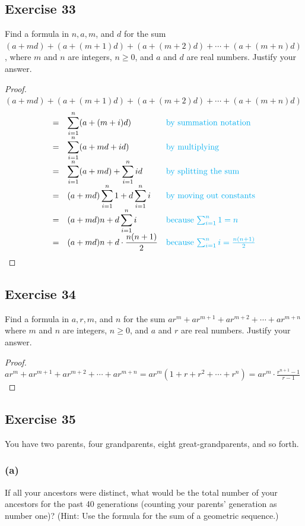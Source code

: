 \documentclass[14pt]{extarticle}
\newcommand{\dps}{\displaystyle}
\newcommand{\cy}{\color{cyan}}
\begin{document}
\subsection{Exercise 33}
Find a formula in $n, a, m$, and $d$ for the sum $(a + md) + (a + (m + 1)d) + (a + (m + 2)d) + \cdots + (a + (m + n)d)$, where $m$ and $n$ are integers, $n \geq 0$, and $a$ and $d$ are real numbers. Justify your answer.

\begin{proof}
$(a + md) + (a + (m + 1)d) + (a + (m + 2)d) + \cdots + (a + (m + n)d)$
\[
\begin{array}{lll}
= & \dps \sum_{i = 1}^{n} (a+(m+i)d) & \text{\cy by summation notation} \\
= & \dps \sum_{i = 1}^{n} (a+md+id) & \text{\cy by multiplying} \\
= & \dps \sum_{i = 1}^{n} (a+md) + \sum_{i = 1}^{n} id & \text{\cy by splitting the sum} \\
= & \dps (a+md)\sum_{i = 1}^{n} 1 + d\sum_{i = 1}^{n} i & \text{\cy by moving out constants} \\
= & \dps (a+md)n + d \sum_{i = 1}^{n} i & \text{\cy because $\sum_{i=1}^{n}1 = n$} \\
= & \dps (a+md)n + d \cdot \frac{n(n+1)}{2} & \text{\cy because $\sum_{i=1}^{n} i = \frac{n(n+1)}{2}$}
\end{array}
\]
\end{proof}

\subsection{Exercise 34}
Find a formula in $a, r, m$, and $n$ for the sum $ar^m + ar^{m+1} + ar^{m+2} + \cdots + ar^{m+n}$ where $m$ and $n$ are integers, $n \geq 0$, and $a$ and $r$ are real numbers. Justify your answer.

\begin{proof}
$\dps ar^m + ar^{m+1} + ar^{m+2} + \cdots + ar^{m + n} = ar^m(1 + r + r^2 + \cdots + r^n) = ar^m \cdot \frac{r^{n + 1} - 1}{r - 1}$
\end{proof}

\subsection{Exercise 35}
You have two parents, four grandparents, eight great-grandparents, and so forth.

\subsubsection{(a)}
If all your ancestors were distinct, what would be the total number of your ancestors for the past 40 generations (counting your parents’ generation as number one)? (Hint: Use the formula for the sum of a geometric sequence.)
\end{document}
